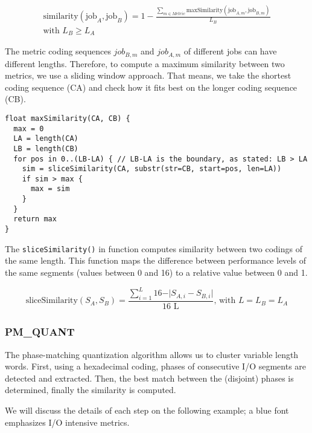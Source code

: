 \documentclass{jhps}
\begin{document}
\begin{multline}
	\text{similarity}\left(\text{job}_{A},\text{job}_{B} \right) = 1-\frac{ \sum _{m \in Metric}^{}\text{maxSimilarity} \left(\text{job}_{A,m},\text{job}_{B,m} \right) }{L_{B}}\\
\text{with }L_{B} \geq L_{A} \label{eq:hexn}
\end{multline}

The metric coding sequences $job_{B,m}$ and $job_{A,m}$ of different jobs can have different lengths.
Therefore, to compute a maximum similarity between two metrics, we use a sliding window approach.
That means, we take the shortest coding sequence (CA) and check how it fits best on the longer coding sequence (CB).


\begin{lstlisting}[caption={Pseudo code of the maxSimilarity() function}]
float maxSimilarity(CA, CB) {
  max = 0
  LA = length(CA)
  LB = length(CB)
  for pos in 0..(LB-LA) { // LB-LA is the boundary, as stated: LB > LA
    sim = sliceSimilarity(CA, substr(str=CB, start=pos, len=LA))
    if sim > max {
      max = sim
    }
  }
  return max
}
\end{lstlisting}

The \texttt{sliceSimilarity()} in  function computes similarity between two codings of the same length.
This function maps the difference between performance levels of the same segments (values between 0 and 16) to a relative value between 0 and 1.

\begin{equation}
	\text{sliceSimilarity}\left(S_{A},S_{B}\right) = \frac{ \sum _{i=1}^{L_{}}16 - \vert S_{A,i}-S_{B,i} \vert }{\text{16 L}_{}}\text{, with }L=L_{B}=L_{A} \label{eq:slicesim}
\end{equation}

\subsubsection{PM\_QUANT}
The phase-matching quantization algorithm allows us to cluster variable length words.
First, using a hexadecimal coding, phases of consecutive I/O segments are detected and extracted.
Then, the best match between the (disjoint) phases is determined, finally the similarity is computed.

We will discuss the details of each step on the following example; a blue font emphasizes I/O intensive  metrics.

\end{document}
